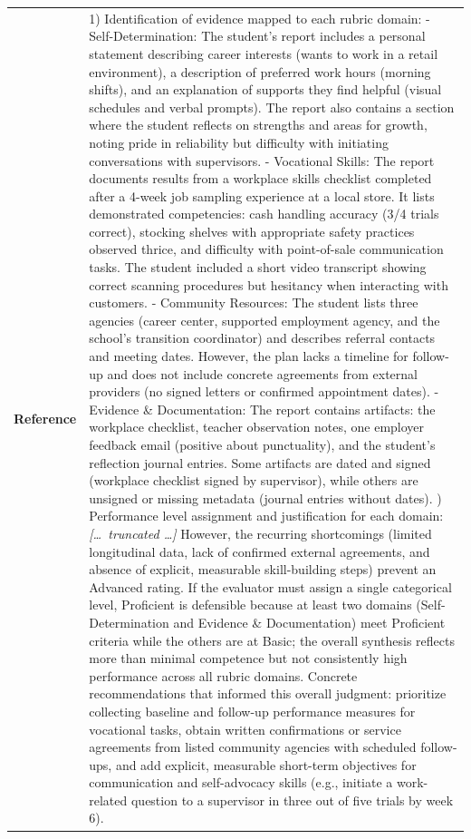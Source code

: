 \begin{longtable}{@{}l p{12.5cm}@{}}
  \textbf{Reference} & 1) Identification of evidence mapped to each rubric domain: \newline - Self-Determination: The student's report includes a personal statement describing career interests (wants to work in a retail environment), a description of preferred work hours (morning shifts), and an explanation of supports they find helpful (visual schedules and verbal prompts). The report also contains a section where the student reflects on strengths and areas for growth, noting pride in reliability but difficulty with initiating conversations with supervisors. \newline - Vocational Skills: The report documents results from a workplace skills checklist completed after a 4-week job sampling experience at a local store. It lists demonstrated competencies: cash handling accuracy (3/4 trials correct), stocking shelves with appropriate safety practices observed thrice, and difficulty with point-of-sale communication tasks. The student included a short video transcript showing correct scanning procedures but hesitancy when interacting with customers. \newline - Community Resources: The student lists three agencies (career center, supported employment agency, and the school's transition coordinator) and describes referral contacts and meeting dates. However, the plan lacks a timeline for follow-up and does not include concrete agreements from external providers (no signed letters or confirmed appointment dates). \newline - Evidence \& Documentation: The report contains artifacts: the workplace checklist, teacher observation notes, one employer feedback email (positive about punctuality), and the student's reflection journal entries. Some artifacts are dated and signed (workplace checklist signed by supervisor), while others are unsigned or missing metadata (journal entries without dates). \newline 2) Performance level assignment and justification for each domain: \newline \textit{[\ldots\ truncated \ldots]} \newline However, the recurring shortcomings (limited longitudinal data, lack of confirmed external agreements, and absence of explicit, measurable skill-building steps) prevent an Advanced rating. If the evaluator must assign a single categorical level, Proficient is defensible because at least two domains (Self-Determination and Evidence \& Documentation) meet Proficient criteria while the others are at Basic; the overall synthesis reflects more than minimal competence but not consistently high performance across all rubric domains. \newline Concrete recommendations that informed this overall judgment: prioritize collecting baseline and follow-up performance measures for vocational tasks, obtain written confirmations or service agreements from listed community agencies with scheduled follow-ups, and add explicit, measurable short-term objectives for communication and self-advocacy skills (e.g., initiate a work-related question to a supervisor in three out of five trials by week 6). 
\end{longtable}
